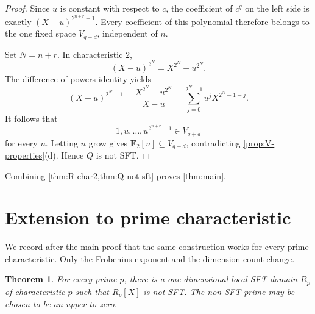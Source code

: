 \documentclass[11pt,reqno]{amsart}
\numberwithin{equation}{section}
\theoremstyle{plain}
\newtheorem{theorem}{Theorem}[section]
\theoremstyle{definition}
\theoremstyle{remark}
\newcommand{\F}{\mathbf F}
\begin{document}
\begin{proof}
Since $u$ is constant with respect to $c$, the coefficient of $c^q$ on the
left side is exactly $(X-u)^{2^{n+r}-1}$.  Every coefficient of this
polynomial therefore belongs to the one fixed space $V_{q+d}$, independent
of $n$.

Set $N=n+r$.  In characteristic $2$,
\[
  (X-u)^{2^N}=X^{2^N}-u^{2^N}.
\]
The difference-of-powers identity yields
\begin{equation}\label{eq:geometric-char2}
  (X-u)^{2^N-1}
   =\frac{X^{2^N}-u^{2^N}}{X-u}
   =\sum_{j=0}^{2^N-1}u^jX^{2^N-1-j}.
\end{equation}
It follows that
\[
  1,u,\ldots,u^{2^{n+r}-1}\in V_{q+d}
\]
for every $n$.  Letting $n$ grow gives
$\F_2[u]\subseteq V_{q+d}$, contradicting
\cref{prop:V-properties}(d).  Hence $Q$ is not SFT.
\end{proof}

Combining \cref{thm:R-char2,thm:Q-not-sft} proves
\cref{thm:main}.

\section{Extension to prime characteristic}
\label{sec:general-p}

We record after the main proof that the same construction works for every
prime characteristic.  Only the Frobenius exponent and the dimension count
change.

\begin{theorem}\label{thm:general-p}
For every prime $p$, there is a one-dimensional local SFT domain $R_p$ of
characteristic $p$ such that $R_p[X]$ is not SFT.  The non-SFT prime may be
chosen to be an upper to zero.
\end{theorem}
\end{document}
